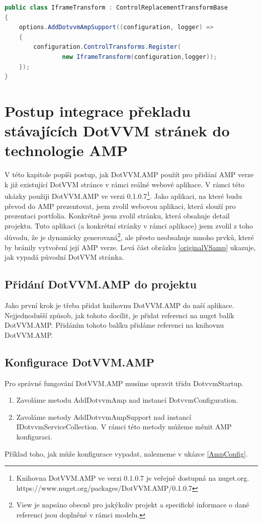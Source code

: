     \begin{lstlisting}[language=c#, caption=Ukazka možné implementace tranformace pro iframe,label=TransformRegistration,captionpos=t]
public class IframeTransform : ControlReplacementTransformBase
{
    options.AddDotvvmAmpSupport((configuration, logger) =>
    {
        configuration.ControlTransforms.Register(
                new IframeTransform(configuration,logger));
    });
}
\end{lstlisting}

\chapter{Postup integrace překladu stávajících DotVVM stránek do technologie AMP}
V této kapitole popíši postup, jak DotVVM.AMP použít pro přidání AMP verze k již existující DotVVM stránce v rámci reálné webové aplikace. V rámci této ukázky použiji DotVVM.AMP ve verzi 0.1.0.7\footnote{\label{nuget}Knihovna DotVVM.AMP ve verzi 0.1.0.7 je veřejně dostupná na nuget.org.\newline
https://www.nuget.org/packages/DotVVM.AMP/0.1.0.7}. Jako aplikaci, na které budu převod do AMP prezentovat, jsem zvolil webovou aplikaci, která slouží pro prezentaci portfolia. Konkrétně jsem zvolil stránku, která obsahuje detail projektu. Tuto aplikaci (a konkrétní stránky v rámci aplikace) jsem zvolil z toho důvodu, že je dynamicky generovaná\footnote{View je napsáno obecně pro jakýkoliv projekt a specifické informace o dané referenci jsou doplněné v rámci modelu. }, ale přesto neobsahuje mnoho prvků, které by bránily vytvoření její AMP verze. Levá část obrázku \ref{originalVSamp} ukazuje, jak vypadá původní DotVVM stránka.

\section*{Přidání DotVVM.AMP do projektu}
Jako první krok je třeba přidat knihovnu DotVVM.AMP do naší aplikace. Nejjednodušší způsob, jak tohoto docílit, je přidat referenci na nuget balík DotVVM.AMP. Přidáním tohoto balíku přidáme referenci na knihovnu DotVVM.AMP.
\section*{Konfigurace DotVVM.AMP}
Pro správné fungování DotVVM.AMP musíme upravit třídu DotvvmStartup.
\begin{enumerate}
    \item  Zavoláme metodu AddDotvvmAmp nad instancí DotvvmConfiguration.
    \item Zavoláme metody AddDotvvmAmpSupport nad instancí IDotvvmServiceCollection.\newline
    V rámci této metody můžeme měnit AMP konfiguraci.
\end{enumerate}
Příklad toho, jak může konfigurace vypadat, nalezneme v ukázce \ref{AmpConfig}.

